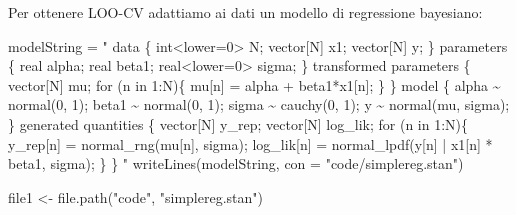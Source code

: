 \documentclass[
  10pt,
  italian,
  a4paper,
  extrafontsizes,onecolumn,openright
  ]{memoir}
\newenvironment{Shaded}{\begin{snugshade}}{\end{snugshade}}
\newcommand{\AttributeTok}[1]{\textcolor[rgb]{0.77,0.63,0.00}{#1}}
\newcommand{\FunctionTok}[1]{\textcolor[rgb]{0.00,0.00,0.00}{#1}}
\newcommand{\NormalTok}[1]{#1}
\newcommand{\OtherTok}[1]{\textcolor[rgb]{0.56,0.35,0.01}{#1}}
\newcommand{\SpecialCharTok}[1]{\textcolor[rgb]{0.00,0.00,0.00}{#1}}
\newcommand{\StringTok}[1]{\textcolor[rgb]{0.31,0.60,0.02}{#1}}
\theoremstyle{definition}
\theoremstyle{definition}
\theoremstyle{definition}
\theoremstyle{definition}
\theoremstyle{remark}
\begin{document}
Per ottenere LOO-CV adattiamo ai dati un modello di regressione bayesiano:

\begin{Shaded}
\begin{Highlighting}[]
\NormalTok{modelString }\OtherTok{=} \StringTok{"}
\StringTok{data \{}
\StringTok{  int\textless{}lower=0\textgreater{} N;}
\StringTok{  vector[N] x1;}
\StringTok{  vector[N] y;}
\StringTok{\}}
\StringTok{parameters \{}
\StringTok{  real alpha;}
\StringTok{  real beta1;}
\StringTok{  real\textless{}lower=0\textgreater{} sigma;}
\StringTok{\}}
\StringTok{transformed parameters \{}
\StringTok{  vector[N] mu;}
\StringTok{  for (n in 1:N)\{}
\StringTok{    mu[n] = alpha + beta1*x1[n];}
\StringTok{  \}}
\StringTok{\}}
\StringTok{model \{}
\StringTok{  alpha \textasciitilde{} normal(0, 1);}
\StringTok{  beta1 \textasciitilde{} normal(0, 1);}
\StringTok{  sigma \textasciitilde{} cauchy(0, 1);}
\StringTok{  y \textasciitilde{} normal(mu, sigma);}
\StringTok{\}}
\StringTok{generated quantities \{}
\StringTok{  vector[N] y\_rep;}
\StringTok{  vector[N] log\_lik;}
\StringTok{  for (n in 1:N)\{}
\StringTok{    y\_rep[n] = normal\_rng(mu[n], sigma);}
\StringTok{    log\_lik[n] = normal\_lpdf(y[n] | x1[n] * beta1, sigma);}
\StringTok{  \}}
\StringTok{\}}
\StringTok{"}
\FunctionTok{writeLines}\NormalTok{(modelString, }\AttributeTok{con =} \StringTok{"code/simplereg.stan"}\NormalTok{)}
\end{Highlighting}
\end{Shaded}

\begin{Shaded}
\end{Shaded}

\begin{Shaded}
\begin{Highlighting}[]
\NormalTok{file1 }\OtherTok{\textless{}{-}} \FunctionTok{file.path}\NormalTok{(}\StringTok{"code"}\NormalTok{, }\StringTok{"simplereg.stan"}\NormalTok{)}
\end{Highlighting}
\end{Shaded}
\end{document}
